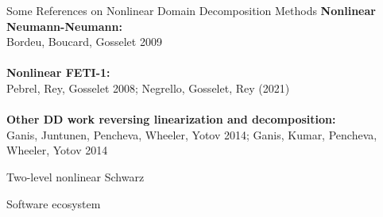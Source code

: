 \begin{frame}{Some References on Nonlinear Domain Decomposition Methods}
	\textbf{Nonlinear Neumann-Neumann:}\\ Bordeu, Boucard, Gosselet 2009\\~\\

	\textbf{Nonlinear FETI-1:}\\
	Pebrel, Rey, Gosselet 2008; Negrello, Gosselet, Rey (2021)\\~\\

	\textbf{Other DD work reversing linearization and decomposition:}\\
	Ganis, Juntunen, Pencheva, Wheeler, Yotov 2014; Ganis, Kumar, Pencheva, Wheeler, Yotov 2014
\end{frame}

\begin{frame}{Two-level nonlinear Schwarz}%
	
\end{frame}

\begin{frame}{Software ecosystem}
	
\end{frame}


